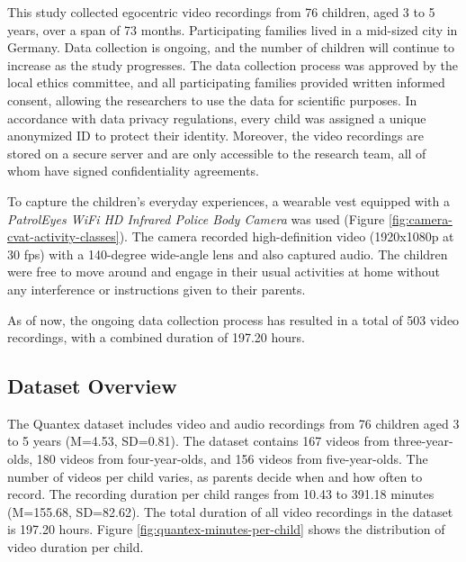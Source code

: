 \documentclass[
  man,floatsintext]{apa6}
\begin{document}
This study collected egocentric video recordings from 76 children, aged 3 to 5 years, over a span of 73 months. Participating families lived in a mid-sized city in Germany. Data collection is ongoing, and the number of children will continue to increase as the study progresses. The data collection process was approved by the local ethics committee, and all participating families provided written informed consent, allowing the researchers to use the data for scientific purposes. In accordance with data privacy regulations, every child was assigned a unique anonymized ID to protect their identity. Moreover, the video recordings are stored on a secure server and are only accessible to the research team, all of whom have signed confidentiality agreements.

To capture the children's everyday experiences, a wearable vest equipped with a \emph{PatrolEyes WiFi HD Infrared Police Body Camera} was used (Figure \ref{fig:camera-cvat-activity-classes}). The camera recorded high-definition video (1920x1080p at 30 fps) with a 140-degree wide-angle lens and also captured audio. The children were free to move around and engage in their usual activities at home without any interference or instructions given to their parents.

As of now, the ongoing data collection process has resulted in a total of 503 video recordings, with a combined duration of 197.20 hours.

\subsection{Dataset Overview}\label{dataset-overview}

The Quantex dataset includes video and audio recordings from 76 children aged 3 to 5 years (M=4.53, SD=0.81). The dataset contains 167 videos from three-year-olds, 180 videos from four-year-olds, and 156 videos from five-year-olds. The number of videos per child varies, as parents decide when and how often to record. The recording duration per child ranges from 10.43 to 391.18 minutes (M=155.68, SD=82.62). The total duration of all video recordings in the dataset is 197.20 hours. Figure \ref{fig:quantex-minutes-per-child} shows the distribution of video duration per child.
\end{document}
